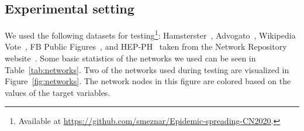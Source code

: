 \documentclass{article}
\begin{document}
\subsection{Experimental setting}
\label{sec:setting}
We used the following datasets for testing\footnote{Available at \url{https://github.com/smeznar/Epidemic-spreading-CN2020}.}: Hamsterster~\cite{soc-hamsterster}, Advogato~\cite{massa2009bowling}, Wikipedia Vote~\cite{leskovec2010signed}, FB Public Figures~\cite{rozemberczki2019gemsec}, and HEP-PH~\cite{leskovec2007hepph} taken from the Network Repository website~\cite{nr}. Some basic statistics of the networks we used can be seen in Table~\ref{tab:networks}. Two of the networks used during testing are visualized in Figure~\ref{fig:networks}. The network nodes in this figure are colored based on the values of the target variables. 

\begin{table}[h!]
\centering
\caption{Basic statistics of the networks used for testing.}
\label{tab:networks}
\end{table}
\end{document}
